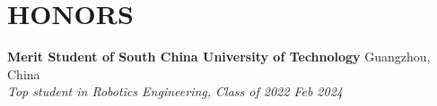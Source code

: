 \documentclass[a4paper,9pt]{extarticle}
\begin{document}
\section*{{\textbf{\fontsize{14pt}{8pt}\selectfont H}\textbf{\scshape ONORS}}}
\textbf{Merit Student of South China University of Technology}  \hfill Guangzhou, China \\
\textit{Top student in Robotics Engineering, Class of 2022 \hfill Feb 2024}
\end{document}

